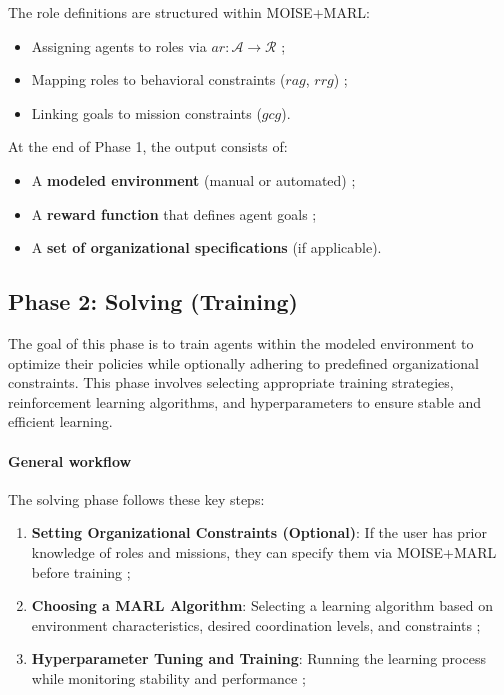 \documentclass[journal]{IEEEtai}
\begin{document}
The role definitions are structured within MOISE+MARL:
\begin{itemize}
    \item Assigning agents to roles via $ar: \mathcal{A} \to \mathcal{R}$ ;
    \item Mapping roles to behavioral constraints ($rag$, $rrg$) ;
    \item Linking goals to mission constraints ($gcg$).
\end{itemize}

At the end of Phase 1, the output consists of:
\begin{itemize}
    \item A \textbf{modeled environment} (manual or automated) ;
    \item A \textbf{reward function} that defines agent goals ;
    \item A \textbf{set of organizational specifications} (if applicable).
\end{itemize}


\subsection{Phase 2: Solving (Training)}

The goal of this phase is to train agents within the modeled environment to optimize their policies while optionally adhering to predefined organizational constraints. This phase involves selecting appropriate training strategies, reinforcement learning algorithms, and hyperparameters to ensure stable and efficient learning.

\paragraph{\textbf{General workflow}}
The solving phase follows these key steps:
\begin{enumerate}
    \item \textbf{Setting Organizational Constraints (Optional)}: If the user has prior knowledge of roles and missions, they can specify them via MOISE+MARL before training ;
    \item \textbf{Choosing a MARL Algorithm}: Selecting a learning algorithm based on environment characteristics, desired coordination levels, and constraints ;
    \item \textbf{Hyperparameter Tuning and Training}: Running the learning process while monitoring stability and performance ;
\end{enumerate}
\end{document}
